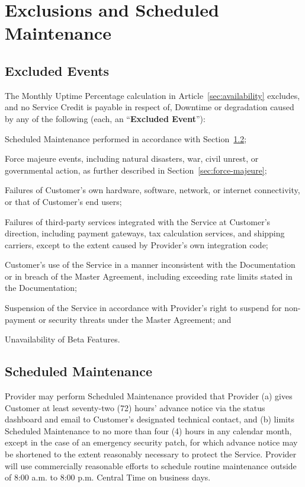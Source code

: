 \section{Exclusions and Scheduled Maintenance}
\label{sec:exclusions}

\subsection{Excluded Events}
The Monthly Uptime Percentage calculation in Article~\ref{sec:availability} excludes, and no Service Credit is payable in respect of, Downtime or degradation caused by any of the following (each, an ``\textbf{Excluded Event}''):

\begin{clauselist}
\item Scheduled Maintenance performed in accordance with Section~\ref{sec:scheduled-maintenance};
\item Force majeure events, including natural disasters, war, civil unrest, or governmental action, as further described in Section~\ref{sec:force-majeure};
\item Failures of Customer's own hardware, software, network, or internet connectivity, or that of Customer's end users;
\item Failures of third-party services integrated with the Service at Customer's direction, including payment gateways, tax calculation services, and shipping carriers, except to the extent caused by Provider's own integration code;
\item Customer's use of the Service in a manner inconsistent with the Documentation or in breach of the Master Agreement, including exceeding rate limits stated in the Documentation;
\item Suspension of the Service in accordance with Provider's right to suspend for non-payment or security threats under the Master Agreement; and
\item Unavailability of Beta Features.
\end{clauselist}

\subsection{Scheduled Maintenance}
\label{sec:scheduled-maintenance}
Provider may perform Scheduled Maintenance provided that Provider (a) gives Customer at least seventy-two (72) hours' advance notice via the status dashboard and email to Customer's designated technical contact, and (b) limits Scheduled Maintenance to no more than four (4) hours in any calendar month, except in the case of an emergency security patch, for which advance notice may be shortened to the extent reasonably necessary to protect the Service. Provider will use commercially reasonable efforts to schedule routine maintenance outside of 8:00 a.m. to 8:00 p.m. Central Time on business days.

